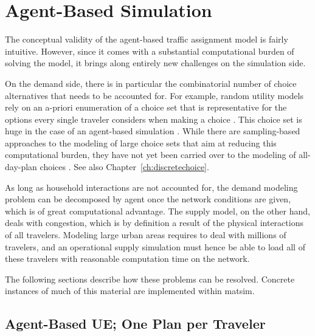 \section{Agent-Based Simulation}
\label{sec:agent-based-simul}

The conceptual validity of the agent-based traffic assignment model is fairly intuitive. 
However, since it comes with a substantial computational burden of solving the model, 
it brings along entirely new challenges on the simulation side.

On the demand side, there is in particular the combinatorial number of choice alternatives that 
needs to be accounted for. For example, random utility models rely on an a-priori enumeration 
of a choice set that is representative for the options every single traveler considers when 
making a choice \citep[][]{BenAkivaLerman_1985}. This choice set is huge in the case of an agent-based 
simulation \citep[][]{bowman-1998}. While there are sampling-based approaches to the modeling 
of large choice sets that aim at reducing this computational burden, they have not yet been 
carried over to the modeling of all-day-plan choices \citep[][]{BenAkivaLerman_1985, FrejingerEtAl_TransResB_2009, 
floetteroed-2012b}.
See also Chapter~\ref{ch:discretechoice}.

As long as household interactions are not accounted for, the demand modeling problem can be 
decomposed by agent once the network conditions are given, which is of great computational advantage. 
The supply model, on the other hand, deals with congestion, which is by definition a result of the 
physical interactions of all travelers. Modeling large urban areas requires to deal with millions of travelers, 
and an operational supply simulation must hence be able to load all of these travelers with 
reasonable computation time on the network. 

The following sections describe how these problems can be resolved. Concrete instances
of much of this material are implemented within \gls{matsim}.


\subsection{Agent-Based UE; One Plan per Traveler}
\label{sec:agent-based-ue}

